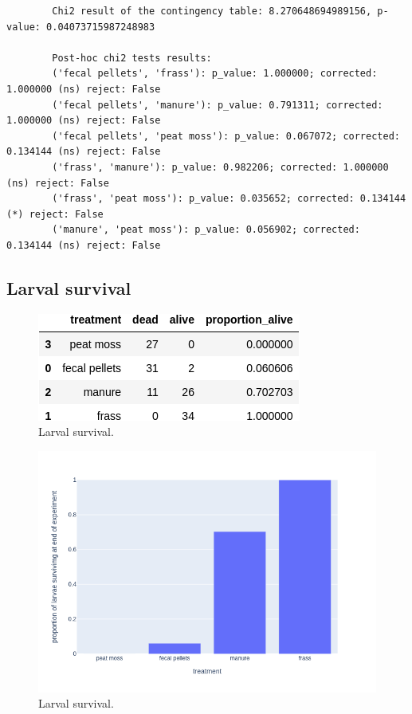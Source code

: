 \documentclass[12pt,letterpaper,english,bibliography=totocnumbered, abstract=on]{scrartcl}
\begin{document}
\begin{footnotesize}
	\begin{verbatim}
		Chi2 result of the contingency table: 8.270648694989156, p-value: 0.04073715987248983
		
		Post-hoc chi2 tests results:
		('fecal pellets', 'frass'): p_value: 1.000000; corrected: 1.000000 (ns) reject: False
		('fecal pellets', 'manure'): p_value: 0.791311; corrected: 1.000000 (ns) reject: False
		('fecal pellets', 'peat moss'): p_value: 0.067072; corrected: 0.134144 (ns) reject: False
		('frass', 'manure'): p_value: 0.982206; corrected: 1.000000 (ns) reject: False
		('frass', 'peat moss'): p_value: 0.035652; corrected: 0.134144 (*) reject: False
		('manure', 'peat moss'): p_value: 0.056902; corrected: 0.134144 (ns) reject: False
	\end{verbatim}
\end{footnotesize}

\subsection{Larval survival}

\begin{figure}[H]
	\centering
	\includegraphics[width=0.7\linewidth]{larval_survival_table}
	\caption{Larval survival.}
	\label{fig:larvalsurvivaltable}
\end{figure}

\begin{figure}[H]
	\centering
	\includegraphics[width=0.7\linewidth]{larval_survival_plot}
	\caption{Larval survival.}
	\label{fig:larvalsurvivalplot}
\end{figure}
\end{document}
